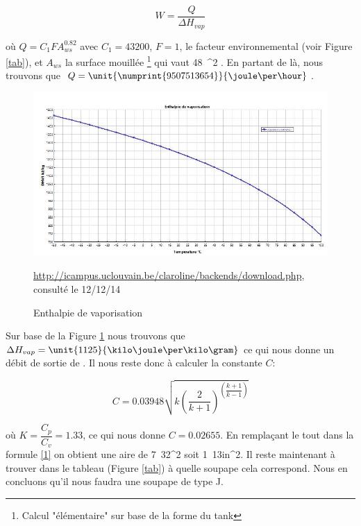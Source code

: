 $$W=\dfrac{Q}{\Delta H_{vap}}$$

où $Q=C_1FA_{ws}^{0.82}$ avec $C_1=43200$, $F=1$, le facteur environnemental (voir Figure \ref{tab}), et $A_ {ws}$ la surface mouillée \footnote{Calcul "élémentaire" sur base de la forme du tank} qui vaut \unit{48\pi}{\meter ^2} . En partant de là, nous trouvons que $Q=\unit{\numprint{9507513654}}{\joule \per \hour}$.

\begin{figure}[ht!]
\centering
\includegraphics[scale=0.4]{tache51.jpg}
\caption{Enthalpie de vaporisation}
\small \url{http://icampus.uclouvain.be/claroline/backends/download.php}, consulté le 12/12/14
\label{graph2}
\end{figure}

Sur base de la Figure \ref{graph2} nous trouvons que $\Delta H_{vap}=\unit{1125}{\kilo \joule \per \kilo \gram}$ ce qui nous donne un débit de sortie de \unit{}{\kilo \gram \per \hour}.
Il nous reste donc à calculer la constante $C$:

$$C=0.03948\sqrt{k\left( \dfrac{2}{k+1}\right)^{\left( \dfrac{k+1}{k-1}\right)}}$$

où $K=\dfrac{C_p}{C_v}=1.33$, ce qui nous donne $C=0.02655$. En remplaçant le tout dans la formule \ref{1} on obtient une aire de \unit{7.32}{\centi \metre^2} soit \unit{1.13}{in^2}. Il reste maintenant à trouver dans le tableau (Figure \ref{tab}) à quelle soupape cela correspond. Nous en concluons qu'il nous faudra une soupape de type J.

